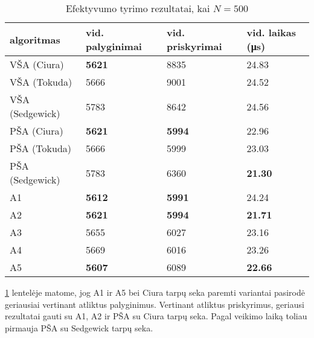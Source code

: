 \documentclass{VUMIFInfKursinis}
\begin{document}
\begin{table}[H]
  \caption{Efektyvumo tyrimo rezultatai, kai $N = 500$}
  \label{results_500}
  \centering
  \begin{tabular}{@{}llll@{}}
  algoritmas & vid. palyginimai                      & vid. priskyrimai                      & vid. laikas (μs)                       \\ \midrule
  VŠA (Ciura)       & \cellcolor[HTML]{70AD47}\textbf{5621} & 8835                                  & 24.83                                  \\
  VŠA (Tokuda)      & 5666                                  & 9001                                  & 24.52                                  \\
  VŠA (Sedgewick)       & 5783                                  & 8642                                  & 24.56                                  \\
  PŠA (Ciura)      & \cellcolor[HTML]{70AD47}\textbf{5621} & \cellcolor[HTML]{70AD47}\textbf{5994} & 22.96                                  \\
  PŠA (Tokuda)      & 5666                                  & 5999                                  & 23.03                                  \\
  PŠA (Sedgewick)      & 5783                                  & 6360                                  & \cellcolor[HTML]{70AD47}\textbf{21.30} \\
  A1      & \cellcolor[HTML]{70AD47}\textbf{5612} & \cellcolor[HTML]{70AD47}\textbf{5991} & 24.24                                  \\
  A2 & \cellcolor[HTML]{70AD47}\textbf{5621} & \cellcolor[HTML]{70AD47}\textbf{5994} & \cellcolor[HTML]{70AD47}\textbf{21.71} \\
  A3      & 5655                                  & 6027                                  & 23.16                                  \\
  A4      & 5669                                  & 6016                                  & 23.26                                  \\
  A5      & \cellcolor[HTML]{70AD47}\textbf{5607} & 6089                                  & \cellcolor[HTML]{70AD47}\textbf{22.66} \\  \bottomrule 
  \end{tabular}
\end{table}


\ref{results_500} lentelėje matome, jog
A1 ir A5 bei Ciura tarpų seka paremti variantai pasirodė geriausiai vertinant atliktus palyginimus.
Vertinant atliktus priskyrimus, geriausi rezultatai gauti su A1, A2 ir PŠA su Ciura tarpų seka.
Pagal veikimo laiką toliau pirmauja PŠA su Sedgewick tarpų seka.
\end{document}
